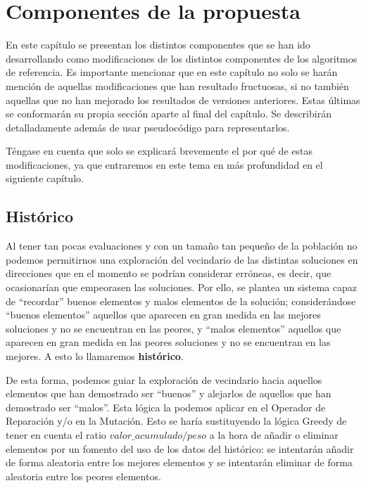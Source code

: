 \chapter{Componentes de la propuesta}

En este capítulo se presentan los distintos componentes que se han ido desarrollando como modificaciones de los distintos componentes de los algoritmos de referencia. 
Es importante mencionar que en este capítulo no solo se harán mención de aquellas modificaciones que han resultado fructuosas, si no también aquellas que no han mejorado los resultados de versiones anteriores. 
Estas últimas se conformarán su propia sección aparte al final del capítulo. 
Se describirán detalladamente además de usar pseudocódigo para representarlos.

Téngase en cuenta que solo se explicará brevemente el por qué de estas modificaciones, ya que entraremos en este tema en más profundidad en el siguiente capítulo. 

\section{Histórico}

Al tener tan pocas evaluaciones y con un tamaño tan pequeño de la población no podemos permitirnos una exploración del vecindario de las distintas soluciones en direcciones que en el momento se podrían considerar erróneas, es decir, que ocasionarían que empeorasen las soluciones. 
Por ello, se plantea un sistema capaz de ``recordar'' buenos elementos y malos elementos de la solución; considerándose ``buenos elementos'' aquellos que aparecen en gran medida en las mejores soluciones y no se encuentran en las peores, y ``malos elementos'' aquellos que aparecen en gran medida en las peores soluciones y no se encuentran en las mejores. 
A esto lo llamaremos \textbf{histórico}. 

De esta forma, podemos guiar la exploración de vecindario hacia aquellos elementos que han demostrado ser ``buenos'' y alejarlos de aquellos que han demostrado ser ``malos''. 
Esta lógica la podemos aplicar en el Operador de Reparación y/o en la Mutación. 
Esto se haría sustituyendo la lógica Greedy de tener en cuenta el ratio $valor\_acumulado/peso$ a la hora de añadir o eliminar elementos por un fomento del uso de los datos del histórico: se intentarán añadir de forma aleatoria entre los mejores elementos y se intentarán eliminar de forma aleatoria entre los peores elementos. 

